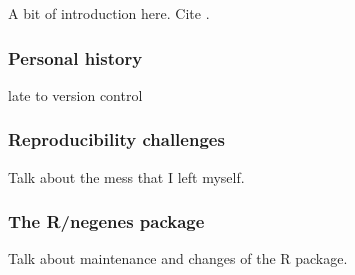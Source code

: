 A bit of introduction here. Cite \citet{lamichhane2003}.

\subsubsection{Personal history}

late to version control

\subsubsection{Reproducibility challenges}

Talk about the mess that I left myself.

\subsubsection{The R/negenes package}

Talk about maintenance and changes of the R package.
